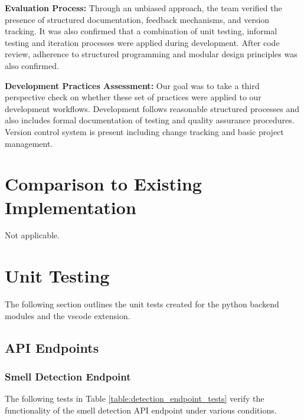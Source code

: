 \documentclass[12pt, titlepage]{article}
\begin{document}
\begin{enumerate}
    \noindent \textbf{Evaluation Process:} Through an unbiased approach, the team verified the
    presence of structured documentation, feedback mechanisms, and
    version tracking. It was also confirmed that a combination of
    unit testing, informal testing and iteration processes were
    applied during development. After code review, adherence to
    structured programming and modular design principles was also confirmed.
    
    \noindent \textbf{Development Practices Assessment:} Our goal was to take a third perspective check on
    whether these set of practices were applied to our development
    workflows. Development follows reasonable structured processes
    and also includes formal documentation of testing and quality
    assurance procedures. Version control system is present including
    change tracking and basic project management.

\end{enumerate}

\section{Comparison to Existing Implementation}

Not applicable.

\section{Unit Testing}

The following section outlines the unit tests created for the python
backend modules and the vscode extension.

\newcommand{\testcount}{\stepcounter{testcase}\thetestcase}
\renewcommand{\arraystretch}{1.2} %

\subsection{API Endpoints}

\subsubsection{Smell Detection Endpoint}
The following tests in Table \ref{table:detection_endpoint_tests} verify the functionality of the smell detection API endpoint under various conditions.
\end{document}
